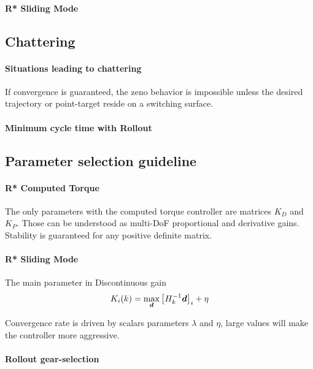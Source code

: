 \paragraph{R* Sliding Mode}


\subsection{Chattering}

\paragraph{Situations leading to chattering}

If convergence is guaranteed, the zeno behavior is impossible unless the desired trajectory or point-target reside on a switching surface. 

\paragraph{Minimum cycle time with Rollout}


\subsection{Parameter selection guideline}

\paragraph{R* Computed Torque} The only parameters with the computed torque controller are matrices $K_D$ and $K_P$. Those can be understood as multi-DoF proportional and derivative gains. Stability is guaranteed for any positive definite matrix.

\paragraph{R* Sliding Mode} The main parameter in Discontinuous gain
%
\begin{align}
K_{i}(k) = \operatornamewithlimits{max}\limits_{\vec{d}} \left[ H_k^{-1} \vec{d} \right]_i + \eta
\label{eq:slidinggain}
\end{align}
%

Convergence rate is driven by scalars parameters $\lambda$ and $\eta$, large values will make the controller more aggressive.

\paragraph{Rollout gear-selection}

